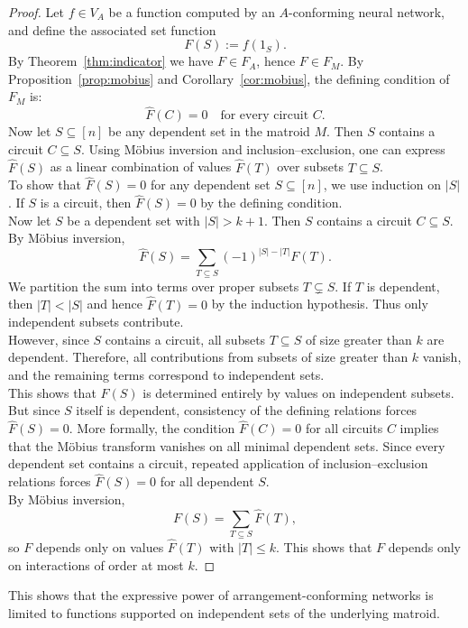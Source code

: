 \documentclass{amsart}
\theoremstyle{definition}
\begin{document}
\begin{proof}
Let $f \in V_A$ be a function computed by an $A$-conforming neural network,
and define the associated set function
\[
F(S) := f(1_S).
\]
\noindent
By Theorem~\ref{thm:indicator} we have $F \in F_A$, hence $F \in F_M$. By Proposition~\ref{prop:mobius} and Corollary~\ref{cor:mobius}, the defining condition of $F_M$ is:
\[
\widehat{F}(C) = 0 \quad \text{for every circuit } C.
\]
\noindent
Now let $S \subseteq [n]$ be any dependent set in the matroid $M$. Then $S$ contains a circuit $C \subseteq S$. Using Möbius inversion and inclusion–exclusion, one can express $\widehat{F}(S)$ as a linear combination of values $\widehat{F}(T)$ over subsets $T \subseteq S$.\\
\noindent
To show that $\widehat{F}(S) = 0$ for any dependent set $S \subseteq [n]$, we use induction on $|S|$.
If $S$ is a circuit, then $\widehat{F}(S) = 0$ by the defining condition.\\
\noindent
Now let $S$ be a dependent set with $|S| > k+1$. Then $S$ contains a circuit $C \subseteq S$. By Möbius inversion,
\[
\widehat{F}(S) = \sum_{T \subseteq S} (-1)^{|S|-|T|} F(T).
\]
\noindent
We partition the sum into terms over proper subsets $T \subsetneq S$. If $T$ is dependent, then $|T| < |S|$ and hence $\widehat{F}(T) = 0$ by the induction hypothesis. Thus only independent subsets contribute.\\
\noindent
However, since $S$ contains a circuit, all subsets $T \subseteq S$ of size greater than $k$ are dependent. Therefore, all contributions from subsets of size greater than $k$ vanish, and the remaining terms correspond to independent sets.\\
\noindent
This shows that $\widehat{F}(S)$ is determined entirely by values on independent subsets. But since $S$ itself is dependent, consistency of the defining relations forces $\widehat{F}(S) = 0$. More formally, the condition $\widehat{F}(C)=0$ for all circuits $C$ implies that the Möbius transform vanishes on all minimal dependent sets. Since every dependent set contains a circuit, repeated application of inclusion–exclusion relations forces $\widehat{F}(S)=0$ for all dependent $S$.\\
\noindent
By Möbius inversion,
\[
F(S) = \sum_{T \subseteq S} \widehat{F}(T),
\]
so $F$ depends only on values $\widehat{F}(T)$ with $|T| \le k$.
\noindent
This shows that $F$ depends only on interactions of order at most $k$.
\end{proof}
\noindent
This shows that the expressive power of arrangement-conforming networks is limited to functions supported on independent sets of the underlying matroid.
\end{document}
